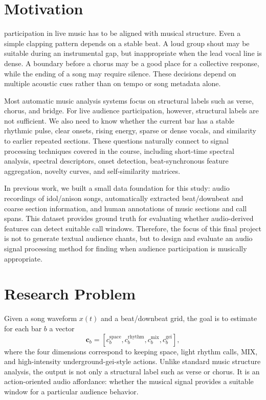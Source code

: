 \documentclass[lettersize,journal]{IEEEtran}
\begin{document}
\section{Motivation}
 participation in live music has to be aligned with musical structure. Even a simple clapping pattern depends on a stable beat. A loud group shout may be suitable during an instrumental gap, but inappropriate when the lead vocal line is dense. A boundary before a chorus may be a good place for a collective response, while the ending of a song may require silence. These decisions depend on multiple acoustic cues rather than on tempo or song metadata alone.

Most automatic music analysis systems focus on structural labels such as verse, chorus, and bridge. For live audience participation, however, structural labels are not sufficient. We also need to know whether the current bar has a stable rhythmic pulse, clear onsets, rising energy, sparse or dense vocals, and similarity to earlier repeated sections. These questions naturally connect to signal processing techniques covered in the course, including short-time spectral analysis, spectral descriptors, onset detection, beat-synchronous feature aggregation, novelty curves, and self-similarity matrices.

In previous work, we built a small data foundation for this study: audio recordings of idol/anison songs, automatically extracted beat/downbeat and coarse section information, and human annotations of music sections and call spans. This dataset provides ground truth for evaluating whether audio-derived features can detect suitable call windows. Therefore, the focus of this final project is not to generate textual audience chants, but to design and evaluate an audio signal processing method for finding when audience participation is musically appropriate.

\section{Research Problem}
Given a song waveform $x(t)$ and a beat/downbeat grid, the goal is to estimate for each bar $b$ a vector
\begin{equation}
\mathbf{c}_b =
\left[
c_b^{\mathrm{space}},
c_b^{\mathrm{rhythm}},
c_b^{\mathrm{mix}},
c_b^{\mathrm{gei}}
\right],
\end{equation}
where the four dimensions correspond to keeping space, light rhythm calls, MIX, and high-intensity underground-gei-style actions. Unlike standard music structure analysis, the output is not only a structural label such as verse or chorus. It is an action-oriented audio affordance: whether the musical signal provides a suitable window for a particular audience behavior.
\end{document}
